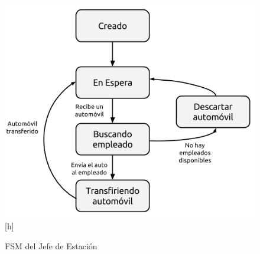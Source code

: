 \documentclass[12pt,a4paper,spanish]{article}
\begin{document}
	\begin{figure}
	\includegraphics[width=1.0\textwidth]{FSM_JDE.png}[h]
	\caption{FSM del Jefe de Estación}
	\end{figure}
\end{document}
